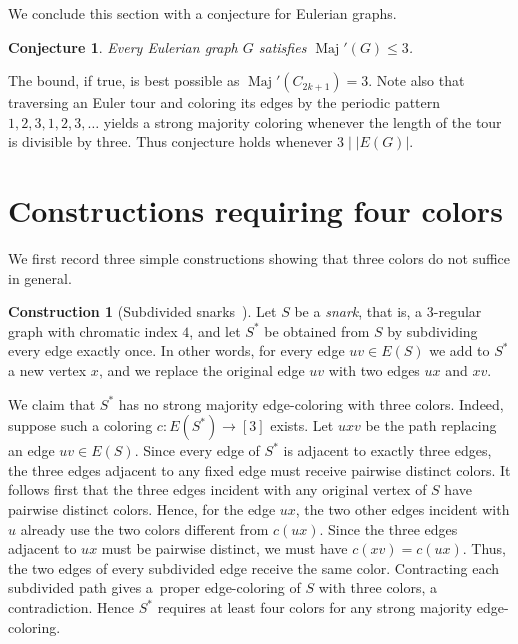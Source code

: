 \documentclass[11pt]{article}
\newtheorem{conjecture}[theorem]{Conjecture}
\theoremstyle{definition}
\newtheorem{construction}{Construction}
\DeclareMathOperator{\Maj}{Maj}
\newcommand{\Majp}{\Maj'}
\begin{document}
We conclude this section with a conjecture for Eulerian graphs.

\begin{conjecture}\label{conj:eulerian}
Every Eulerian graph \(G\) satisfies \(\Majp(G)\le 3\).
\end{conjecture}

The bound, if true, is best possible as \(\Majp(C_{2k+1})= 3\). Note also that traversing an Euler tour and coloring its edges by the periodic pattern \(1,2,3,1,2,3,\dots\) yields a strong majority coloring whenever the length of the tour is divisible by three. Thus conjecture holds whenever $3\mid |E(G)|$.

\section{Constructions requiring four colors}

We first record three simple constructions showing that three colors do not suffice in
general.

\begin{construction}[Subdivided snarks~\cite{KKPW}]
Let \(S\) be a \emph{snark}, that is, a 3-regular graph with chromatic index \(4\), and let \(S^\ast\) be obtained from \(S\) by subdividing every edge exactly once. In other words, for every edge \(uv\in E(S)\) we add to $S^*$ a new vertex $x$, and we replace the original edge $uv$ with two edges $ux$ and $xv$.

We claim that \(S^\ast\) has no strong majority edge-coloring with three colors. Indeed, suppose such a coloring $c:E(S^\ast)\to[3]$ exists. Let \(uxv\) be the path replacing an edge \(uv\in E(S)\). Since every edge of \(S^\ast\) is adjacent to exactly three edges, the three edges adjacent to any fixed edge must receive pairwise distinct colors. It follows first that the three edges incident with any original vertex of \(S\) have pairwise distinct colors. Hence, for the edge \(ux\), the two other edges incident with \(u\) already use the two colors different from \(c(ux)\). Since the three edges adjacent to \(ux\) must be pairwise distinct, we must have $c(xv)=c(ux)$. Thus, the two edges of every subdivided edge receive the same color. Contracting each subdivided path gives a~proper edge-coloring of \(S\) with three colors, a contradiction. Hence \(S^\ast\) requires at least four colors for any strong majority edge-coloring.
\end{construction}
\end{document}

